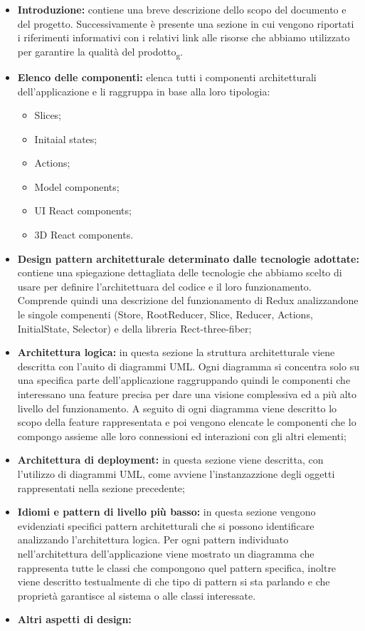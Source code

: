\begin{itemize}
\item \textbf{Introduzione:} contiene una breve descrizione dello scopo del documento e del progetto.
Successivamente è presente una sezione in cui vengono riportati i riferimenti informativi 
con i relativi link alle risorse che abbiamo utilizzato per garantire la qualità del prodotto\textsubscript{g}.

\item \textbf{Elenco delle componenti:} elenca tutti i componenti architetturali dell'applicazione e li raggruppa in base alla loro tipologia:
\begin{itemize}
 	\item Slices;
 	\item  Initaial states;
 	\item Actions; 
 	\item Model components; 
 	\item UI React components; 
 	\item 3D React components.
\end{itemize}

\item \textbf{Design pattern architetturale determinato dalle tecnologie adottate:} contiene una spiegazione dettagliata delle tecnologie che abbiamo scelto di usare per definire l'architettuara del codice e il loro funzionamento.
Comprende quindi una descrizione del funzionamento di Redux analizzandone le singole compenenti (Store, RootReducer, Slice, Reducer, Actions, InitialState, Selector) e della libreria Rect-three-fiber;

\item \textbf{ Architettura logica:} in questa sezione la struttura architetturale viene descritta con l'auito di diagrammi UML. Ogni diagramma si concentra solo su una specifica parte dell'applicazione raggruppando quindi le componenti che interessano una feature precisa per dare una visione complessiva ed a più alto livello del funzionamento.
A seguito di ogni diagramma viene descritto lo scopo della feature rappresentata e poi vengono elencate le componenti che lo compongo assieme alle loro connessioni ed interazioni con gli altri elementi;

\item \textbf{Architettura di deployment:} in questa sezione viene descritta, con l'utilizzo di diagrammi UML, come avviene l'instanzazzione degli oggetti rappresentati nella sezione precedente;

\item \textbf{Idiomi e pattern di livello più basso:} in questa sezione vengono evidenziati specifici pattern architetturali che si possono identificare analizzando l'architettura logica. Per ogni pattern individuato nell'architettura dell'applicazione viene mostrato un diagramma che rappresenta tutte le classi che compongono quel pattern specifica, inoltre viene descritto testualmente di che tipo di pattern si sta parlando e che proprietà garantisce al sistema o alle classi interessate.

\item \textbf{Altri aspetti di design:}

\end{itemize}